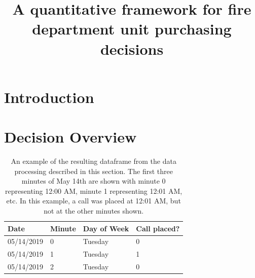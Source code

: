 \documentclass[article]{proc}
\begin{document}
\title{A quantitative framework for fire department unit purchasing decisions}
\address[1]{The University of Texas at Austin, Austin, TX, 78712, USA}

\maketitle



\section{Introduction}



\section{Decision Overview}



\begin{table}[h]
\centering
\caption{An example of the resulting dataframe from the data processing described in this section. The first three minutes of May 14th are shown with minute 0 representing 12:00 AM, minute 1 representing 12:01 AM, etc. In this example, a call was placed at 12:01 AM, but not at the other minutes shown.}
\begin{tabular}{|l|l|l|l|}
\hline
\textbf{Date} & \textbf{Minute} & \textbf{Day of Week} & \textbf{Call placed?} \\ \hline
05/14/2019    & 0               & Tuesday              & 0                     \\ \hline
05/14/2019    & 1               & Tuesday              & 1                     \\ \hline
05/14/2019    & 2               & Tuesday              & 0                     \\ \hline
\end{tabular}
\label{minutedf}
\end{table}
\end{document}
